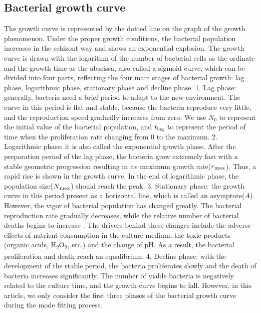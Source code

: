 \documentclass[11pt]{article}
\begin{document}
    \subsection{Bacterial growth curve}
    The growth curve is represented by the dotted line on the graph of the growth phenomenon. Under the proper growth conditions, the bacterial population increases in the schizont way and shows an exponential explosion\citep{eagon1962pseudomonas}. The growth curve is drawn with the logarithm of the number of bacterial cells as the ordinate and the growth time as the abscissa, also called a sigmoid curve, which can be divided into four parts, reflecting the four main stages of bacterial growth\citep{baty2004estimating}: lag phase, logarithmic phase, stationary phase and decline phase. 1. Lag phase: generally, bacteria need a brief period to adapt to the new environment. The curve in this period is flat and stable, because the bacteria reproduce very little, and the reproduction speed gradually increases from zero\citep{bertrand2019lag}. We use $N_0$ to represent the initial value of the bacterial population, and $t\textsubscript{lag}$ to represent the period of time when the proliferation rate changing from 0 to the maximum. 2. Logarithmic phase: it is also called the exponential growth phase. After the preparation period of the lag phase, the bacteria grow extremely fast with a stable geometric progression resulting in its maximum growth rate($r\textsubscript{max}$). Thus, a rapid rise is shown in the growth curve. In the end of logarithmic phase, the population size($N\textsubscript{max}$) should reach the peak. 3. Stationary phase: the growth curve in this period present as a horizontal line, which is called an asymptote($A$). However, the vigor of bacterial population has changed greatly. The bacterial reproduction rate gradually decreases, while the relative number of bacterial deaths begins to increase \citep{bridges2001effect}. The drivers behind these changes include the adverse effects of nutrient consumption in the culture medium, the toxic products (organic acids, H\textsubscript{2}O\textsubscript{2}, etc.) and the change of pH. As a result, the bacterial proliferation and death reach an equalibrium. 4. Decline phase: with the development of the stable period, the bacteria proliferates slowly and the death of bacteria increases significantly. The number of viable bacteria is negatively related to the culture time, and the growth curve begins to fall\citep{novick1955growth}. However, in this article, we only consider the first three phases of the bacterial growth curve during the mode fitting process.
    
\end{document}
